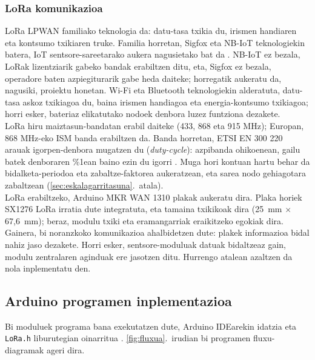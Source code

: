 \documentclass[10pt]{article}
\begin{document}
\subsubsection{LoRa komunikazioa}

\ac{LoRa} \ac{LPWAN} familiako teknologia da: datu-tasa txikia du, irismen handiaren eta kontsumo txikiaren truke. Familia horretan, Sigfox eta NB-IoT teknologiekin batera, \ac{IoT} sentsore-sareetarako aukera nagusietako bat da \cite{raza2017,adelantado2017}. NB-IoT ez bezala, \ac{LoRa}k lizentziarik gabeko bandak erabiltzen ditu, eta, Sigfox ez bezala, operadore baten azpiegiturarik gabe heda daiteke; horregatik aukeratu da, nagusiki, proiektu honetan. Wi-Fi eta Bluetooth teknologiekin alderatuta, datu-tasa askoz txikiagoa du, baina irismen handiagoa eta energia-kontsumo txikiagoa; horri esker, bateriaz elikatutako nodoek denbora luzez funtziona dezakete.\\

\ac{LoRa} hiru maiztasun-bandatan erabil daiteke (433, 868 eta 915 MHz); Europan, 868 MHz-eko \ac{ISM} banda erabiltzen da. Banda horretan, \ac{ETSI} EN 300 220 arauak igorpen-denbora mugatzen du (\textit{duty-cycle}): azpibanda ohikoenean, gailu batek denboraren \%1ean baino ezin du igorri \cite{etsi300220}. Muga hori kontuan hartu behar da bidalketa-periodoa eta zabaltze-faktorea aukeratzean, eta sarea nodo gehiagotara zabaltzean (\ref{sec:eskalagarritasuna}.~atala).\\

\ac{LoRa} erabiltzeko, Arduino MKR WAN 1310 plakak aukeratu dira. Plaka horiek SX1276 \ac{LoRa} irratia dute integratuta, eta tamaina txikikoak dira (25~mm $\times$ 67,6~mm); beraz, modulu txiki eta eramangarriak eraikitzeko egokiak dira. Gainera, bi noranzkoko komunikazioa ahalbidetzen dute: plakek informazioa bidal nahiz jaso dezakete. Horri esker, sentsore-moduluak datuak bidaltzeaz gain, modulu zentralaren aginduak ere jasotzen ditu. Hurrengo atalean azaltzen da nola inplementatu den.\\

\subsection{Arduino programen inplementazioa}
\label{sec:programak}

Bi moduluek programa bana exekutatzen dute, Arduino \ac{IDE}arekin idatzia eta \texttt{LoRa.h} liburutegian oinarritua \cite{arduinolora}. \ref{fig:fluxua}.~irudian bi programen fluxu-diagramak ageri dira.\\
\end{document}
